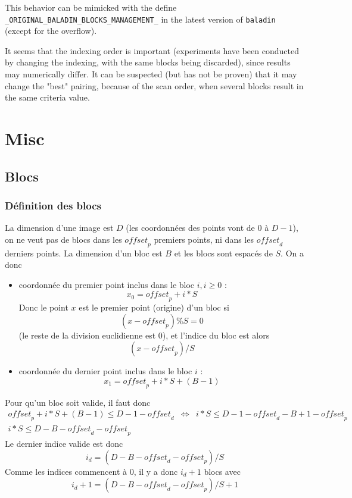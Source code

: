 \documentclass[10pt]{report}
\def\baladin{\texttt{baladin} }
\begin{document}
This behavior can be mimicked with the define \verb|_ORIGINAL_BALADIN_BLOCKS_MANAGEMENT_| in the latest version of \baladin (except for the overflow). 

It seems that the indexing order is important (experiments have been conducted by changing the indexing, with the same blocks being discarded), since results may numerically differ. It can be suspected (but has not be proven) that it may change the "best" pairing, because of the scan order, when several blocks result in the same criteria value.



\newpage
\chapter{Misc}


\section{Blocs}

\subsection{D\'efinition des blocs}

La dimension d'une image est $D$ (les coordonn\'ees des points vont de $0$ \`a $D-1$), on ne veut pas de blocs dans les $\textit{offset}_p$ premiers points, ni dans les $\textit{offset}_d$ derniers points. La dimension d'un bloc est $B$ 
et les blocs sont espac\'es de $S$. On a donc 
\begin{itemize}
\item coordonn\'ee du premier point inclus dans le bloc $i , i\geq 0$ : 
$$x_0 = \textit{offset}_p + i * S$$ 
Donc le point $x$ est le premier point (origine) d'un bloc si
$$(x - \textit{offset}_p) \% S = 0$$ 
(le reste de la division euclidienne est $0$), et l'indice du bloc est alors  
$$(x - \textit{offset}_p) / S$$
\item coordonn\'ee du dernier point inclus dans le bloc $i$ : 
$$x_1 = \textit{offset}_p + i * S + (B-1)$$
\end{itemize}
Pour qu'un bloc soit valide, il faut donc 
\begin{eqnarray*}
\textit{offset}_p + i * S + (B-1) \leq D - 1 - \textit{offset}_d
& \Longleftrightarrow &
i * S \leq D - 1 - \textit{offset}_d -B +1 - \textit{offset}_p \\
i * S \leq D-B - \textit{offset}_d - \textit{offset}_p
\end{eqnarray*}
Le dernier indice valide est donc 
$$
i_d = \left( D-B - \textit{offset}_d - \textit{offset}_p \right) / S
$$
Comme les indices commencent \`a $0$, il y a donc $i_d +1$ blocs avec
$$
i_d + 1 = \left( D-B - \textit{offset}_d - \textit{offset}_p \right) / S + 1
$$
\end{document}
